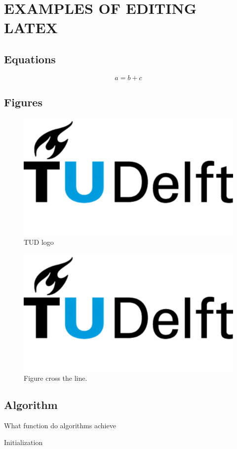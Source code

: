 \section{EXAMPLES OF EDITING LATEX}

\subsection{Equations}
\begin{equation}
    a = b + c
    \label{eq1}
\end{equation}

\subsection{Figures}

\begin{figure}[H]
    \centering
    \includegraphics[width=0.5\linewidth]{img/TUD.jpg}
    \caption{TUD logo}
    \label{TUD logo}
\end{figure}

\begin{figure}[!t]
    \centering
    \includegraphics[width=0.7\linewidth]{img/TUD.jpg}
    \caption{Figure cross the line.}
    \label{fig:system_dia}
\end{figure}


\subsection{Algorithm}

\begin{algorithm}[H]
    \caption{What function do algorithms achieve}
    \label{alg}
    \SetAlgoLined
    Initialization\\
    \For{}{
        \If{}{
            \If{}{
            }
        }
    }
    
    
\end{algorithm}


